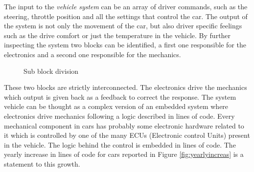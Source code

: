 \documentclass[../main.tex]{subfiles}
\begin{document}
The input to the \textit{vehicle system} can be an array of driver commands, such as the steering, throttle position and all the settings that control the car. The output of the system is not only the movement of the car, but also driver specific feelings such as the drive comfort or just the temperature in the vehicle. By further inspecting the system two blocks can be identified, a first one responsible for the electronics and a second one responsible for the mechanics. 
     \begin{figure}[ht]
        \begin{center}
        \end{center}
        \caption{Sub block division}
    \end{figure}       
These two blocks are strictly interconnected. The electronics drive the mechanics which output is given back as a feedback to correct the response. The system vehicle can be thought as a complex version of an embedded system where electronics drive mechanics following a logic described in lines of code.
Every mechanical component in cars has probably some electronic hardware related to it which is controlled by one of the many \gls{ECU}s (Electronic control Units) present in the vehicle. The logic behind the control is embedded in lines of code. The yearly increase in lines of code for cars reported in Figure \ref{fig:yearlyincreas} is a statement to this growth. 
\end{document}
